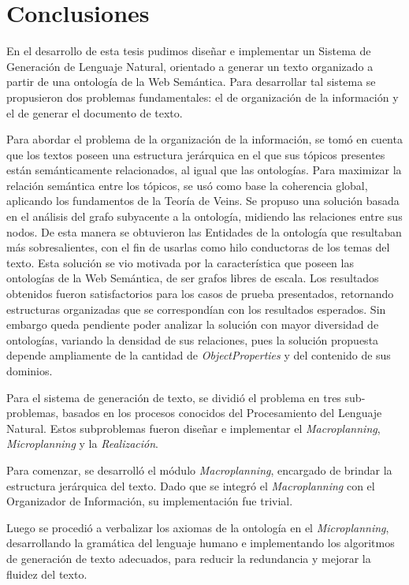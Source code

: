 \chapter{Conclusiones}
En el desarrollo de esta tesis pudimos diseñar e implementar un Sistema de Generación de Lenguaje Natural, orientado a generar un texto organizado a partir de una ontología de la Web Semántica. Para desarrollar tal sistema se propusieron dos problemas fundamentales: el de organización de la información y el de generar el documento de texto. 

Para abordar el problema de la organización de la información, se tomó en cuenta que los textos poseen una estructura jerárquica en el que sus tópicos presentes están semánticamente relacionados, al igual que las ontologías. Para maximizar la relación semántica entre los tópicos, se usó como base la coherencia global, aplicando los fundamentos de la Teoría de Veins. Se propuso una solución basada en el análisis del grafo subyacente a la ontología, midiendo las relaciones entre sus nodos. De esta manera se obtuvieron las Entidades de la ontología que resultaban más sobresalientes, con el fin de usarlas como hilo conductoras de los temas del texto.
Esta solución se vio motivada por la característica que poseen las ontologías de la Web Semántica, de ser grafos libres de escala. Los resultados obtenidos fueron satisfactorios para los casos de prueba presentados, retornando estructuras organizadas que se correspondían con los resultados esperados. Sin embargo queda pendiente poder analizar la solución con mayor diversidad de ontologías, variando la densidad de sus relaciones, pues la solución propuesta depende ampliamente de la cantidad de \emph{ObjectProperties} y del contenido de sus dominios.

Para el sistema de generación de texto, se dividió el problema en tres sub-problemas, basados en los procesos conocidos del Procesamiento del Lenguaje Natural. Estos subproblemas fueron diseñar e implementar el \emph{Macroplanning}, \emph{Microplanning} y la \emph{Realización}. 

Para comenzar, se desarrolló el módulo \emph{Macroplanning}, encargado de brindar la estructura jerárquica del texto. Dado que se integró el \emph{Macroplanning} con el Organizador de Información, su implementación fue trivial.

Luego se procedió a verbalizar los axiomas de la ontología en el \emph{Microplanning}, desarrollando la gramática del lenguaje humano e implementando los algoritmos de generación de texto adecuados, para reducir la redundancia y mejorar la fluidez del texto. 

